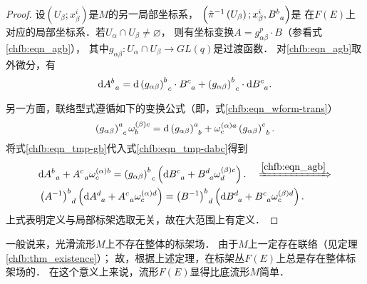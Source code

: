 \begin{proof}
设$\left(U_{\beta} ; x_{\beta}^{i}\right)$是$M$的另一局部坐标系，
$\left(\tilde{\pi}^{-1}\left(U_{\beta}\right) ; x_{\beta}^{i}, B_{\hphantom{a}a}^{b}\right)$是
在$F(E)$上对应的局部坐标系．若$U_{\alpha} \cap U_{\beta} \neq \varnothing$，
则有坐标变换$A=g_{\alpha \beta}^p \cdot B$（参看式\eqref{chfb:eqn_agb}），
其中$g_{\alpha \beta}: U_{\alpha} \cap U_{\beta} \rightarrow GL(q)$是过渡函数．
对\eqref{chfb:eqn_agb}取外微分，有
\begin{equation}\label{chfb:eqn_tmp-dabc}
    \mathrm{d} A_{\hphantom{a}a}^{b}=\mathrm{d}\left(g_{\alpha \beta}\right)_{\hphantom{a}c}^{b} \cdot 
    B_{\hphantom{a}a}^{c}+\left(g_{\alpha \beta}\right)_{\hphantom{a}c}^{b} \cdot \mathrm{d} B_{\hphantom{a}a}^{c}.
\end{equation}

另一方面，联络型式遵循如下的变换公式（即，式\eqref{chfb:eqn_wform-trans}）
\begin{equation}\label{chfb:eqn_tmp-gb}
    \left(g_{\alpha \beta}\right)_{\hphantom{a}c}^{a} \omega_{b}^{(\beta) c}=\mathrm{d}
    \left(g_{\alpha\beta}\right)_{\hphantom{a}b}^{a}+
    \omega_{c}^{(\alpha) a} \left(g_{\alpha \beta}\right)_{\hphantom{a}b}^{c}.
\end{equation}
将式\eqref{chfb:eqn_tmp-gb}代入式\eqref{chfb:eqn_tmp-dabc}得到 
\begin{align*}
    &\mathrm{d} A_{\hphantom{a}a}^{b}+A_{\hphantom{a}a}^{c}  \omega_{c}^{(\alpha) b}
    =\left(g_{\alpha \beta}\right)_{\hphantom{a}c}^{b}\left(\mathrm{d} B_{\hphantom{a}a}^{c}
    +B_{\hphantom{a}a}^{d}  \omega_{d}^{(\beta) c}\right).
\quad \xRightarrow{\ref{chfb:eqn_agb}} \\
&\left(A^{-1}\right)_{\hphantom{a}d}^{b} \left(\mathrm{d} A_{\hphantom{a}a}^{d}
+A_{\hphantom{a}a}^{c}  \omega_{c}^{(\alpha) d}\right)
=\left(B^{-1}\right)_{\hphantom{a}d}^{b}\left(\mathrm{d} B_{\hphantom{a}a}^{d}
+B_{\hphantom{a}a}^{c}  \omega_{c}^{(\beta) d}\right) .
\end{align*}
上式表明定义与局部标架选取无关，故在大范围上有定义．
\end{proof}

一般说来，光滑流形$M$上不存在整体的标架场．
由于$M$上一定存在联络（见定理\ref{chfb:thm_existence}）；
故，根据上述定理，在标架丛$F(E)$上总是存在整体标架场的．
在这个意义上来说，流形$F(E)$显得比底流形$M$简单．

